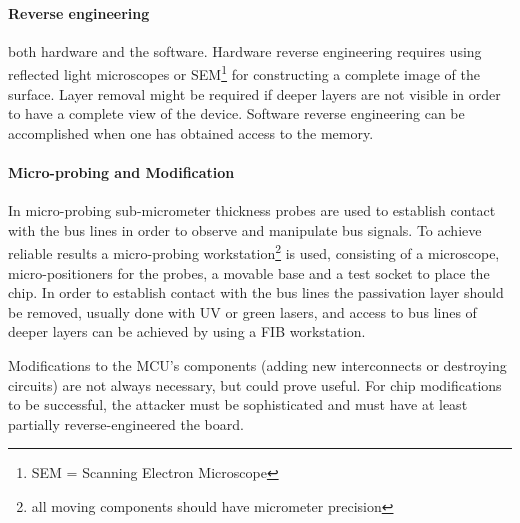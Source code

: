 \documentclass[10pt,a4paper,twocolumn]{article}
\begin{document}
	\paragraph{Reverse engineering} both hardware and the software. Hardware reverse engineering requires using reflected light microscopes or SEM\footnote{SEM = Scanning Electron Microscope} for constructing a complete image of the surface. Layer removal might be required if deeper layers are not visible in order to have a complete view of the device. Software reverse engineering can be accomplished when one has obtained access to the memory.
	
	\paragraph{Micro-probing and Modification} In micro-probing sub-micrometer thickness probes are used to establish contact with the bus lines in order to observe and manipulate bus signals. To achieve reliable results a micro-probing workstation\footnote{all moving components should have micrometer precision} is used, consisting of a microscope, micro-positioners for the probes, a movable base and a test socket to place the chip. In order to establish contact with the bus lines the passivation layer should be removed, usually done with UV or green lasers, and access to bus lines of deeper layers can be achieved by using a FIB workstation.
	
	Modifications to the MCU's components (adding new interconnects or destroying circuits) are not always necessary, but could prove useful. For chip modifications to be successful, the attacker must be sophisticated and must have at least partially reverse-engineered the board.
	
	



	
	
		
	
\end{document}
